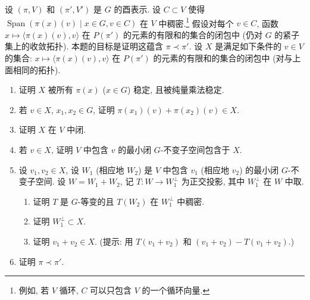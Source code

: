 \begin{exercise}[弱包含的判定]
\label{ex:III.6.2.3}
设 $(\pi, V)$ 和 $(\pi', V')$ 是 $G$ 的酉表示. 设 $C \subset V$ 使得 $\operatorname{Span}(\pi(x)(v) \mid x \in G, v \in C)$ 在 $V$ 中稠密.\footnote{例如, 若 $V$ 循环, $C$ 可以只包含 $V$ 的一个循环向量.} 假设对每个 $v \in C$, 函数 $x \longmapsto \langle \pi(x)(v), v \rangle$ 在 $P(\pi')$ 的元素的有限和的集合的闭包中 (仍对 $G$ 的紧子集上的收敛拓扑). 本题的目标是证明这蕴含 $\pi \prec \pi'$.
设 $X$ 是满足如下条件的 $v \in V$ 的集合: $x \longmapsto \langle \pi(x)(v), v \rangle$ 在 $P(\pi')$ 的元素的有限和的集合的闭包中 (对与上面相同的拓扑).
\begin{enumerate}
\item[(a)] 证明 $X$ 被所有 $\pi(x)$ ($x \in G$) 稳定, 且被纯量乘法稳定.
\item[(b)] 若 $v \in X$, $x_1, x_2 \in G$, 证明 $\pi(x_1)(v) + \pi(x_2)(v) \in X$.
\item[(c)] 证明 $X$ 在 $V$ 中闭.
\item[(d)] 若 $v \in X$, 证明 $V$ 中包含 $v$ 的最小闭 $G$-不变子空间包含于 $X$.
\item[(e)] 设 $v_1, v_2 \in X$, 设 $W_1$ (相应地 $W_2$) 是 $V$ 中包含 $v_1$ (相应地 $v_2$) 的最小闭 $G$-不变子空间. 设 $W = W_1 + W_2$, 记 $T \colon W \to W_1^{\perp}$ 为正交投影, 其中 $W_1^{\perp}$ 在 $W$ 中取.
  \begin{enumerate}
  \item[(i)] 证明 $T$ 是 $G$-等变的且 $T(W_2)$ 在 $W_1^{\perp}$ 中稠密.
  \item[(ii)] 证明 $W_1^{\perp} \subset X$.
  \item[(iii)] 证明 $v_1 + v_2 \in X$. (提示: 用 $T(v_1 + v_2)$ 和 $(v_1 + v_2) - T(v_1 + v_2)$.)
  \end{enumerate}
\item[(f)] 证明 $\pi \prec \pi'$.
\end{enumerate}
\end{exercise}

